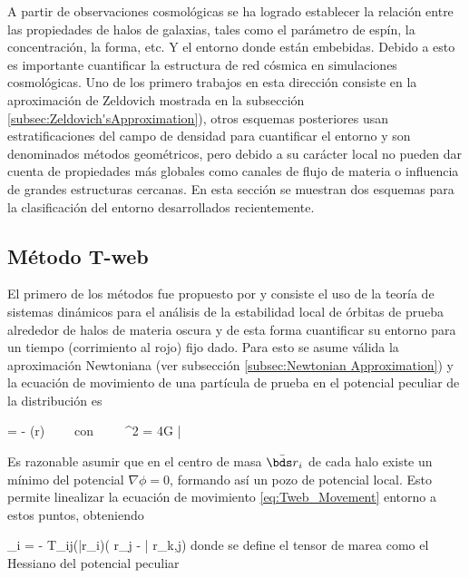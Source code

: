 A partir de observaciones cosmológicas se ha logrado establecer la 
relación entre las propiedades de halos de galaxias, tales como el parámetro 
de espín, la concentración, la forma, etc. Y el entorno donde están 
embebidas. Debido a esto es importante cuantificar la estructura de red 
cósmica en simulaciones cosmológicas. Uno de los primero trabajos en esta 
dirección consiste en la aproximación de Zeldovich mostrada en la subsección 
\ref{subsec:Zeldovich'sApproximation}), otros esquemas posteriores usan 
estratificaciones del campo de densidad para cuantificar el entorno y son 
denominados métodos geométricos, pero debido a su carácter local no 
pueden dar cuenta de propiedades más globales como canales de flujo de 
materia o influencia de grandes estructuras cercanas. En esta sección se 
muestran dos esquemas para la clasificación del entorno desarrollados 
recientemente.


	\subsection{Método T-web}
	\label{subsec:TheT-webMethod}


El primero de los métodos fue propuesto por \cite{Hahn2007} y consiste el
uso de la teoría de sistemas dinámicos para el análisis de la estabilidad 
local de órbitas de prueba alrededor de halos de materia oscura y de esta 
forma cuantificar su entorno para un tiempo (corrimiento al rojo) fijo 
dado. Para esto se asume válida la aproximación Newtoniana (ver subsección 
\ref{subsec:Newtonian Approximation}) y la ecuación de movimiento de una 
partícula de prueba en el potencial peculiar de la distribución es


{  = - \nabla \phi(\bds r) \ \ \ \ 
\mbox{con}\ \ \ \ \ \nabla^2 \phi = 4\pi G \bar \rho \delta}


Es razonable asumir que en el centro de masa $\bar{\bds r}_i$ de cada halo
existe un mínimo del potencial $\nabla \phi = 0$, formando así un pozo de 
potencial local. Esto permite linea\-lizar la ecuación de movimiento 
\ref{eq:Tweb_Movement} entorno a estos puntos, obteniendo


{ _i = - T_{ij}(\bar{\bds r}_i)( r_j - \bar{ r}_{k,j})}
donde se define el tensor de marea como el Hessiano del potencial peculiar



